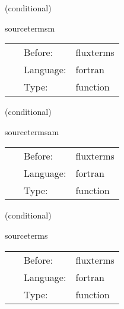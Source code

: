 \documentclass{article}
\begin{document}
\vspace{5mm}

   (conditional) 

\hspace{5mm} sourcetermsm 

\hspace{5mm}{\it source term calculation - mhd version } 


\hspace{5mm}

 \begin{tabular*}{160mm}{cll} 
~ & Before:  & fluxterms \\ 
~ & Language:  & fortran \\ 
~ & Type:  & function \\ 
\end{tabular*} 


\vspace{5mm}

   (conditional) 

\hspace{5mm} sourcetermsam 

\hspace{5mm}{\it source term calculation - vector potential mhd version } 


\hspace{5mm}

 \begin{tabular*}{160mm}{cll} 
~ & Before:  & fluxterms \\ 
~ & Language:  & fortran \\ 
~ & Type:  & function \\ 
\end{tabular*} 


\vspace{5mm}

   (conditional) 

\hspace{5mm} sourceterms 

\hspace{5mm}{\it source term calculation } 


\hspace{5mm}

 \begin{tabular*}{160mm}{cll} 
~ & Before:  & fluxterms \\ 
~ & Language:  & fortran \\ 
~ & Type:  & function \\ 
\end{tabular*} 
\end{document}
